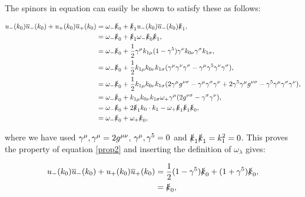 	The spinors in equation can easily be shown to satisfy these as follows:

	\begin{subequations}
	\begin{align*}
		u_-(k_0)\overline{u}_-(k_0) + u_+(k_0)\overline{u}_+(k_0) &= \omega_-\slashed k_0 + \slashed k_1 u_-(k_0)\overline{u}_-(k_0)\slashed k_1,\\
	                                                                  &= \omega_-\slashed k_0 + \slashed k_1 \omega_-\slashed k_0\slashed k_1,\\
	                                                                  &= \omega_-\slashed k_0 + \frac{1}{2}\gamma^{\mu}k_{1\mu}(1-\gamma^{5})\gamma^{\nu}k_{0\nu}\gamma^{\sigma}k_{1\sigma},\\
	                                                                  &= \omega_-\slashed k_0 + \frac{1}{2} k_{1\mu}k_{0\nu}k_{1\sigma}(\gamma^{\mu}\gamma^{\nu}\gamma^{\sigma}-\gamma^{\mu}\gamma^{5}\gamma^{\nu}\gamma^{\sigma}),\\
	                                                                  &= \omega_-\slashed k_0 + \frac{1}{2} k_{1\mu}k_{0\nu}k_{1\sigma}(2\gamma^{\mu}g^{\nu\sigma} - \gamma^{\mu}\gamma^{\sigma}\gamma^{\nu}+2\gamma^{5}\gamma^{\mu}g^{\nu\sigma} - \gamma^{5}\gamma^{\mu}\gamma^{\sigma}\gamma^{\nu}),\\
	                                                                  &= \omega_-\slashed k_0 + k_{1\mu}k_{0\nu}k_{1\sigma}\omega_+\gamma^{\mu}(2g^{\nu\sigma} - \gamma^{\sigma}\gamma^{\nu}),\\
	                                                                  &= \omega_-\slashed k_0 + 2\slashed k_1 k_0\cdot k_1 - \omega_+\slashed k_1\slashed k_1 \slashed k_0,\\
	                                                                  &= \omega_-\slashed k_0 + \omega_+\slashed k_0,
	\end{align*}
	\end{subequations}

	where we have used ${\gamma^{\mu}, \gamma^{\mu}}=2g^{\mu\nu}$, ${\gamma^{\mu}, \gamma^{5}}=0$ and $\slashed k_1\slashed k_1=k_1^2=0$.  This proves the property of equation \ref{prop2} and inserting the definition of $\omega_\lambda$ gives:

	\begin{subequations}
	\begin{align*}
		u_-(k_0)\overline{u}_-(k_0) + u_+(k_0)\overline{u}_+(k_0) &= \frac{1}{2}(1-\gamma^{5})\slashed k_0 + (1+\gamma^{5})\slashed k_0,\\
		                                                          &= \slashed k_0,
	\end{align*}
	\end{subequations}

